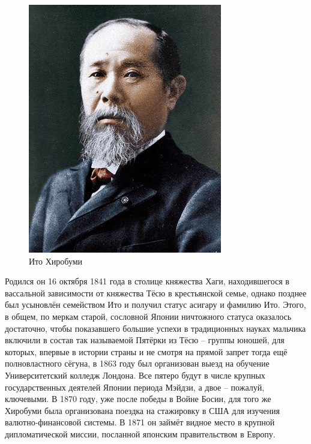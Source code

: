 \begin{figure}[h!tb] 
	\centering\includegraphics[scale=0.5]{Glava2/vIGO4y6PHDo.jpg}
	\caption{Ито Хиробуми}%
\end{figure}

Родился он 16 октября 1841 года в столице княжества Хаги, находившегося в вассальной зависимости от княжества Тёсю в крестьянской семье, однако позднее был усыновлён семейством Ито и получил статус асигару и фамилию Ито. Этого, в общем, по меркам старой, сословной Японии ничтожного статуса оказалось достаточно, чтобы показавшего большие успехи в традиционных науках мальчика включили в состав так называемой Пятёрки из Тёсю – группы юношей, для которых, впервые в истории страны и не смотря на прямой запрет тогда ещё полновластного сёгуна, в 1863 году был организован выезд на обучение Университетский колледж Лондона. Все пятеро будут в числе крупных государственных деятелей Японии периода Мэйдзи, а двое – пожалуй, ключевыми. В 1870 году, уже после победы в Войне Босин, для того же Хиробуми была организована поездка на стажировку в США для изучения валютно-финансовой системы. В 1871 он займёт видное место в крупной дипломатической миссии, посланной японским правительством в Европу.

